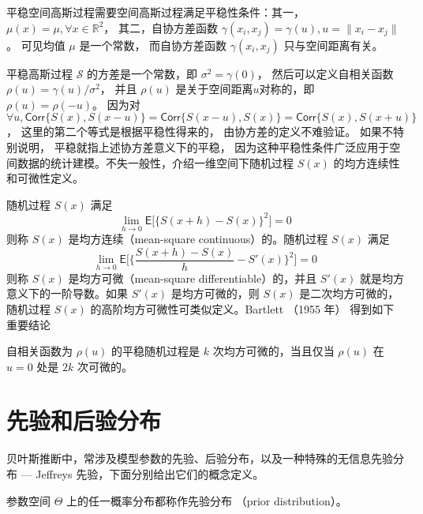 \documentclass[12pt,a4paper,UTF8,twoside]{book}
\theoremstyle{definition}
\theoremstyle{definition}
\theoremstyle{definition}
\theoremstyle{remark}
\let\BeginKnitrBlock\begin \let\EndKnitrBlock\end
\begin{document}
平稳空间高斯过程需要空间高斯过程满足平稳性条件：其一， \(\mu(x) = \mu, \forall x \in \mathbb{R}^2\)， 其二，自协方差函数 \(\gamma(x_i,x_j) = \gamma(u),u=\|x_{i} - x_{j}\|\)。 可见均值 \(\mu\) 是一个常数， 而自协方差函数 \(\gamma(x_i,x_j)\) 只与空间距离有关。

平稳高斯过程 \(\mathcal{S}\) 的方差是一个常数，即 \(\sigma^2 = \gamma(0)\)， 然后可以定义自相关函数 \(\rho(u) = \gamma(u)/\sigma^2\)， 并且 \(\rho(u)\) 是关于空间距离\(u\)对称的，即 \(\rho(u) = \rho(-u)\)。 因为对 \(\forall u, \mathsf{Corr}\{S(x),S(x-u)\} = \mathsf{Corr}\{S(x-u), S(x)\} = \mathsf{Corr}\{S(x),S(x+u)\}\)， 这里的第二个等式是根据平稳性得来的， 由协方差的定义不难验证。 如果不特别说明， 平稳就指上述协方差意义下的平稳， 因为这种平稳性条件广泛应用于空间数据的统计建模。不失一般性，介绍一维空间下随机过程 \(S(x)\) 的均方连续性和可微性定义。

\BeginKnitrBlock{definition}[连续性和可微性]
\protect\hypertarget{def:continuous-differentiable}{}{\label{def:continuous-differentiable} \iffalse (连续性和可微性) \fi{} }随机过程 \(S(x)\) 满足
\[ \lim_{h \to 0} \mathsf{E}\big[ \{S(x + h) - S(x)\}^{2} \big] = 0 \]
\noindent 则称 \(S(x)\) 是均方连续（mean-square continuous）的。随机过程 \(S(x)\) 满足
\[ \lim_{h \to 0} \mathsf{E} \big[ \{ \frac{S(x+h) - S(x)}{h} - S'(x) \}^2 \big] = 0 \]
\noindent 则称 \(S(x)\) 是均方可微（mean-square differentiable）的，并且 \(S'(x)\) 就是均方意义下的一阶导数。如果 \(S'(x)\) 是均方可微的，则 \(S(x)\) 是二次均方可微的，随机过程 \(S(x)\) 的高阶均方可微性可类似定义\citep{Diggle2007}。Bartlett （1955 年） \citep{Bartlett1955} 得到如下重要结论
\EndKnitrBlock{definition}

\BeginKnitrBlock{theorem}[平稳随机过程的可微性]
\protect\hypertarget{thm:stationary-mean-square-properties}{}{\label{thm:stationary-mean-square-properties} \iffalse (平稳随机过程的可微性) \fi{} }自相关函数为 \(\rho(u)\) 的平稳随机过程是 \(k\) 次均方可微的，当且仅当 \(\rho(u)\) 在 \(u = 0\) 处是 \(2k\) 次可微的。
\EndKnitrBlock{theorem}

\hypertarget{sec:bayes-prior}{%
\section{先验和后验分布}\label{sec:bayes-prior}}

贝叶斯推断中，常涉及模型参数的先验、后验分布，以及一种特殊的无信息先验分布 --- Jeffreys 先验，下面分别给出它们的概念定义\citep{mao2006}。

\BeginKnitrBlock{definition}[先验分布]
\protect\hypertarget{def:prior-distribution}{}{\label{def:prior-distribution} \iffalse (先验分布) \fi{} }参数空间 \(\Theta\) 上的任一概率分布都称作先验分布 （prior distribution）\citep{mao2006}。
\EndKnitrBlock{definition}
\end{document}
